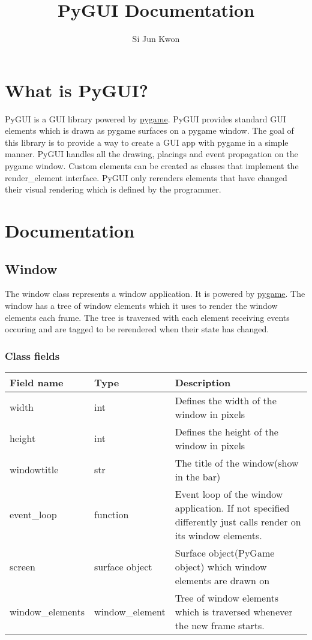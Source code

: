 \documentclass{scrartcl}
\title{PyGUI Documentation}
\author{Si Jun Kwon}
\date{\displaydate{date}}
\begin{document}
    \maketitle
    \newpage
    \tableofcontents
    \newpage
    \section{What is PyGUI?}
    PyGUI is a GUI library powered by \href{https://www.pygame.org/}{pygame}. PyGUI provides
    standard GUI elements which is drawn as pygame surfaces on a pygame window. The goal of this library
    is to provide a way to create a GUI app with pygame in a simple manner. PyGUI handles all the drawing,
    placings and event propagation on the pygame window. Custom elements can be created as classes that
    implement the render\_element interface. PyGUI only rerenders elements that have changed their visual 
    rendering which is defined by the programmer.
    \section{Documentation}
    \subsection{Window}
    The window class represents a window application. It is powered by \href{https://www.pygame.org/}{pygame}. The window has a tree of window elements which
    it uses to render the window elements each frame. The tree is traversed with each element receiving
    events occuring and are tagged to be rerendered when their state has changed.
    \subsubsection{Class fields}
    \begin{tabular}{|p{}|p{}|p{}|}
        \hline
        Field name & Type & Description\\
        \hline
        width & int & Defines the width of the window in pixels\\
        \hline
        height & int & Defines the height of the window in pixels\\
        \hline
        windowtitle & str & The title of the window(show in the bar)\\
        \hline
        event\_loop & function & Event loop of the window application. If not specified differently just calls render on its window elements.\\
        \hline
        screen & surface object & Surface object(PyGame object) which window elements are drawn on\\
        \hline
        window\_elements & window\_element& Tree of window elements which is traversed whenever the new frame starts.\\
        \hline
    \end{tabular}
\end{document}

